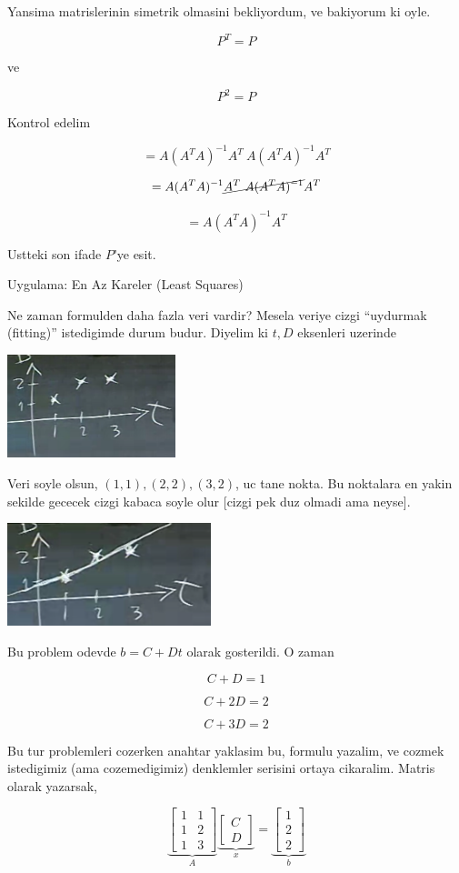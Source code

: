 \documentclass[12pt,fleqn]{article}\usepackage{../common}
\begin{document}
Yansima matrislerinin simetrik olmasini bekliyordum, ve bakiyorum ki oyle. 

\[ P^T = P \]

ve 

\[ P^2 = P \]

Kontrol edelim

\[=  A(A^TA)^{-1}A^T \ A(A^TA)^{-1}A^T \]

\[=  A(A^TA)^{-1}\cancel{A^T \ A(A^TA)^{-1}}A^T \]

\[=  A(A^TA)^{-1}A^T \]

Ustteki son ifade $P$'ye esit. 

Uygulama: En Az Kareler (Least Squares)

Ne zaman formulden daha fazla veri vardir? Mesela veriye cizgi ``uydurmak
(fitting)'' istedigimde durum budur. Diyelim ki $t,D$ eksenleri uzerinde

\includegraphics[height=3cm]{15_6.png}

Veri soyle olsun, $(1,1),(2,2),(3,2)$, uc tane nokta. Bu noktalara en yakin
sekilde gececek cizgi kabaca soyle olur [cizgi pek duz olmadi ama neyse].

\includegraphics[height=3cm]{15_7.png}

Bu problem odevde $b = C+Dt$ olarak gosterildi. O zaman 

\[ C + D = 1 \]

\[ C + 2D = 2 \]

\[ C + 3D = 2 \]

Bu tur problemleri cozerken anahtar yaklasim bu, formulu yazalim, ve cozmek
istedigimiz (ama cozemedigimiz) denklemler serisini ortaya
cikaralim. Matris olarak yazarsak, 

\[ 
\underbrace{
\left[\begin{array}{rr}
1 & 1 \\
1 & 2 \\
1 & 3 
\end{array}\right]
}_{A}
\underbrace{
\left[\begin{array}{r}
C  \\
D  
\end{array}\right]
}_{x}
=
\underbrace{
\left[\begin{array}{r}
1 \\
2 \\
2  
\end{array}\right]
}_{b}
 \]
\end{document}
